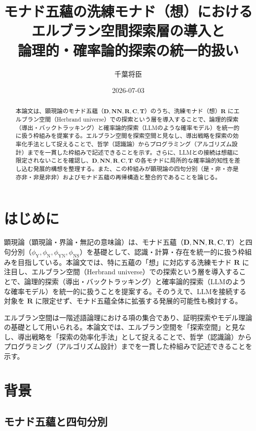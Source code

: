 \documentclass[11pt,a4paper]{ltjsarticle}
\title{モナド五蘊の洗練モナド（想）における\\エルブラン空間探索層の導入と\\論理的・確率論的探索の統一的扱い}
\author{千葉将臣}
\date{2026-07-03}
\theoremstyle{definition}
\newcommand{\Md}{\mathbf{D}}
\newcommand{\Mnn}{\mathbf{NN}}
\newcommand{\Mr}{\mathbf{R}}
\newcommand{\MC}{\mathbf{C}}
\newcommand{\MT}{\mathbf{T}}
\newcommand{\phiY}{\phi_{\text{Y}}}
\newcommand{\phiN}{\phi_{\text{N}}}
\newcommand{\phiYN}{\phi_{\text{YN}}}
\newcommand{\phiNS}{\phi_{\text{NS}}}
\begin{document}
\maketitle

\begin{abstract}
本論文は、顕現論のモナド五蘊（$\Md, \Mnn, \Mr, \MC, \MT$）のうち、洗練モナド（想）$\Mr$ にエルブラン空間（Herbrand universe）での探索という層を導入することで、論理的探索（導出・バックトラッキング）と確率論的探索（LLMのような確率モデル）を統一的に扱う枠組みを提案する。エルブラン空間を探索空間と見なし、導出戦略を探索の効率化手法として捉えることで、哲学（認識論）からプログラミング（アルゴリズム設計）までを一貫した枠組みで記述できることを示す。さらに、LLMとの接続は想蘊に限定されないことを確認し、$\Md, \Mnn, \Mr, \MC, \MT$ の各モナドに局所的な確率論的知性を差し込む発展的構想を整理する。また、この枠組みが顕現論の四句分別（是・非・亦是亦非・非是非非）およびモナド五蘊の再帰構造と整合的であることを論じる。
\end{abstract}

\section{はじめに}

顕現論（顕現論・界論・無記の意味論）は、モナド五蘊（$\Md, \Mnn, \Mr, \MC, \MT$）と四句分別（$\phiY, \phiN, \phiYN, \phiNS$）を基礎として、認識・計算・存在を統一的に扱う枠組みを目指している。本論文では、特に五蘊の「想」に対応する洗練モナド $\Mr$ に注目し、エルブラン空間（Herbrand universe）での探索という層を導入することで、論理的探索（導出・バックトラッキング）と確率論的探索（LLMのような確率モデル）を統一的に扱うことを提案する。そのうえで、LLMを接続する対象を $\Mr$ に限定せず、モナド五蘊全体に拡張する発展的可能性も検討する。

エルブラン空間は一階述語論理における項の集合であり、証明探索やモデル理論の基礎として用いられる\cite{herbrand}。本論文では、エルブラン空間を「探索空間」と見なし、導出戦略を「探索の効率化手法」として捉えることで、哲学（認識論）からプログラミング（アルゴリズム設計）までを一貫した枠組みで記述できることを示す。

\section{背景}

\subsection{モナド五蘊と四句分別}
\end{document}
